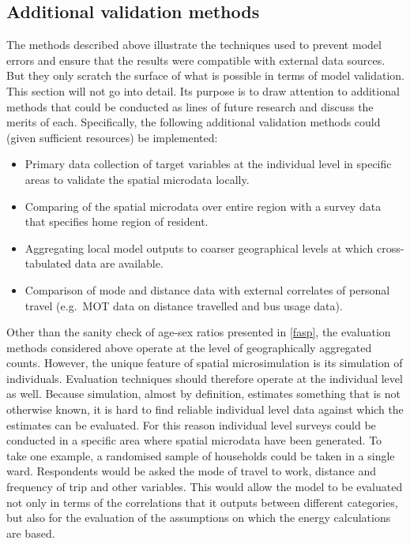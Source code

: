 \documentclass[a4paper, 11pt, twoside]{Thesis}
\begin{document}
\subsection{Additional validation methods}
The methods described above illustrate the techniques used to prevent
model errors and ensure that the results were compatible with external data
sources. But they only scratch the surface of what is possible in terms of
model validation. This section will not go into detail. Its
purpose is to draw attention to
additional methods that could be conducted as lines of future research
and discuss the merits of each. Specifically, the following additional validation
methods could (given sufficient resources) be implemented:
\begin{itemize}
 \item Primary data collection of target variables at the individual level
 in specific areas to  validate the spatial microdata locally.
 \item Comparing of the spatial microdata over entire region with a
 survey data that specifies home region of resident.
 \item Aggregating local model outputs to coarser geographical levels at which
 cross-tabulated data are available.
 \item Comparison of mode and distance data with external correlates of personal
 travel (e.g.~MOT data on distance travelled and bus usage data).
\end{itemize}

Other than the sanity check of age-sex ratios presented in \cref{fasp},
the evaluation methods considered above operate at the level of geographically
aggregated counts. However, the unique feature of spatial microsimulation is
its simulation of individuals. Evaluation techniques should therefore operate
at the individual level as well.
Because simulation, almost by definition, estimates something that is not
otherwise known, it is hard to find reliable individual level
data against which the estimates can be evaluated. For this reason
individual level surveys could be conducted in a specific area where
spatial microdata have been generated. To take one example, a randomised
sample of households could be taken in a single ward. Respondents would be
asked the mode of travel to work, distance and frequency of trip and
other variables. This would allow the model to be evaluated
not only in terms of the correlations that it outputs between different categories,
but also for the evaluation of the assumptions on which the energy calculations 
are based.
\end{document}
